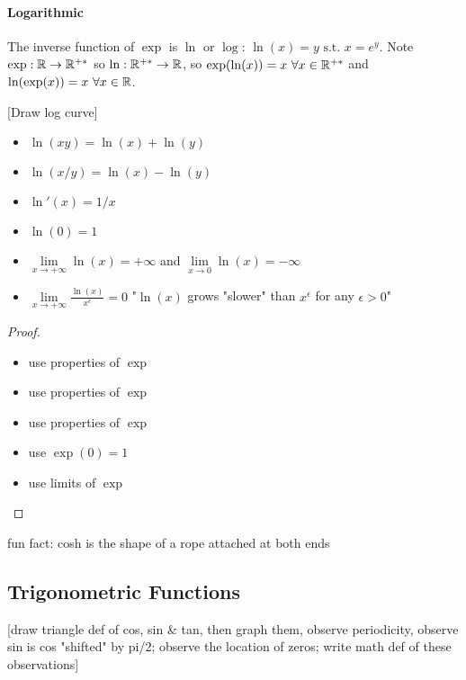 \paragraph{Logarithmic}
\begin{definition}
	The inverse function of $\exp$ is $\ln$ or $\log$: $\ln(x) = y \text{ s.t. } x = e^y$. Note $\exp: \mathbb{R} \to \mathbb{R}^{+*}$ so $\ln: \mathbb{R}^{+*} \to \mathbb{R}$, so $\exp(\ln(x)) = x \ \forall x \in \mathbb{R}^{+*}$ and $\ln(\exp(x)) = x \ \forall x \in \mathbb{R}$.
\end{definition}
[Draw log curve]
\begin{property}
	\begin{itemize}
		\item $\ln(xy)=\ln(x)+\ln(y)$
		\item $\ln(x/y)=\ln(x)-\ln(y)$
		\item $\ln'(x) = 1/x$
		\item $\ln(0)=1$
		\item $\lim\limits_{x \to +\infty} \ln(x) = +\infty$ and $\lim\limits_{x \to 0} \ln(x) = -\infty$
		\item $\lim\limits_{x \to + \infty} \frac{\ln(x)}{x^\epsilon} = 0$ "$\ln(x)$ grows "slower" than $x^\epsilon$ for any $\epsilon > 0$"
	\end{itemize}
\end{property}
\begin{proof}
	\begin{itemize}
		\item use properties of $\exp$
		\item use properties of $\exp$
		\item use properties of $\exp$
		\item use $\exp(0)=1$
		\item use limits of $\exp$
	\end{itemize}
\end{proof}
fun fact: cosh is the shape of a rope attached at both ends

\subsection{Trigonometric Functions}
[draw triangle def of cos, sin \& tan, then graph them, observe periodicity, observe sin is cos "shifted" by pi/2; observe the location of zeros; write math def of these observations]

